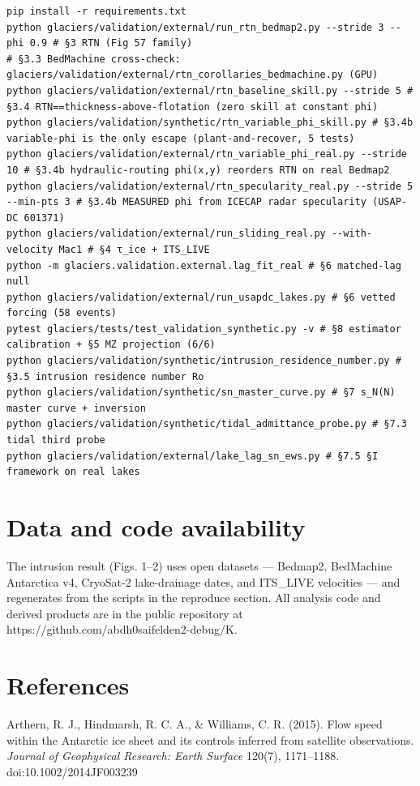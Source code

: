 \documentclass[11pt]{article}
\begin{document}
\begin{Verbatim}
pip install -r requirements.txt
python glaciers/validation/external/run_rtn_bedmap2.py --stride 3 --phi 0.9 # §3 RTN (Fig 57 family)
# §3.3 BedMachine cross-check: glaciers/validation/external/rtn_corollaries_bedmachine.py (GPU)
python glaciers/validation/external/rtn_baseline_skill.py --stride 5 # §3.4 RTN==thickness-above-flotation (zero skill at constant phi)
python glaciers/validation/synthetic/rtn_variable_phi_skill.py # §3.4b variable-phi is the only escape (plant-and-recover, 5 tests)
python glaciers/validation/external/rtn_variable_phi_real.py --stride 10 # §3.4b hydraulic-routing phi(x,y) reorders RTN on real Bedmap2
python glaciers/validation/external/rtn_specularity_real.py --stride 5 --min-pts 3 # §3.4b MEASURED phi from ICECAP radar specularity (USAP-DC 601371)
python glaciers/validation/external/run_sliding_real.py --with-velocity Mac1 # §4 τ_ice + ITS_LIVE
python -m glaciers.validation.external.lag_fit_real # §6 matched-lag null
python glaciers/validation/external/run_usapdc_lakes.py # §6 vetted forcing (58 events)
pytest glaciers/tests/test_validation_synthetic.py -v # §8 estimator calibration + §5 MZ projection (6/6)
python glaciers/validation/synthetic/intrusion_residence_number.py # §3.5 intrusion residence number Ro
python glaciers/validation/synthetic/sn_master_curve.py # §7 s_N(N) master curve + inversion
python glaciers/validation/synthetic/tidal_admittance_probe.py # §7.3 tidal third probe
python glaciers/validation/external/lake_lag_sn_ews.py # §7.5 §I framework on real lakes
\end{Verbatim}

\section*{Data and code availability}


The intrusion result (Figs. 1–2) uses open datasets — Bedmap2, BedMachine Antarctica v4, CryoSat-2 lake-drainage dates, and ITS\_LIVE velocities — and regenerates from the scripts in the reproduce section. All analysis code and derived products are in the public repository at https://github.com/abdh0saifelden2-debug/K.


\section*{References}


Arthern, R. J., Hindmarsh, R. C. A., \& Williams, C. R. (2015). Flow speed within the Antarctic ice sheet and its controls inferred from satellite observations. \emph{Journal of Geophysical Research: Earth Surface} 120(7), 1171–1188. doi:10.1002/2014JF003239
\end{document}
